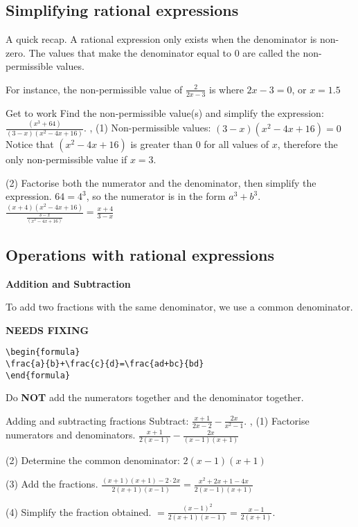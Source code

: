 \documentclass[../../main.tex]{subfiles}
\begin{document}
\subsection{Simplifying rational expressions}
A quick recap. A rational expression only exists when the denominator is non-zero. The values that make the denominator equal to 0 are called the non-permissible values.

For instance, the non-permissible value of $\frac{2}{2x-3}$ is where $2x-3=0$, or $x=1.5$

\begin{example}{Get to work}
Find the non-permissible value(s) and simplify the expression: $\frac{\left(x^{3}+64\right)}{(3-x)\left(x^{2}-4x+16\right)}$.
\sep
(1) Non-permissible values: $(3-x)\left(x^{2}-4x+16\right)=0$
Notice that $\left(x^{2}-4x+16\right)$ is greater than 0 for all values of $x$, therefore the only non-permissible value if $x=3$.

(2) Factorise both the numerator and the denominator, then simplify the expression. $64=4^{3}$, so the numerator is in the form $a^{3}+b^{3}$.
$\frac{(x+4)\left(x^{2}-4x+16\right)}{\frac{3-x}{\left(x^{2}-4x+16\right)}}=\frac{x+4}{3-x}$
\end{example}

\subsection{Operations with rational expressions}
\textbf{Addition and Subtraction}

To add two fractions with the same denominator, we use a common denominator.

{\hfill\Large\bfseries NEEDS FIXING\hfill}
\begin{lstlisting}
\begin{formula}
\frac{a}{b}+\frac{c}{d}=\frac{ad+bc}{bd}
\end{formula}
 \end{lstlisting} %
Do \textbf{NOT} add the numerators together and the denominator together. %

\begin{example}{Adding and subtracting fractions}
Subtract: $\frac{x+1}{2x-2}-\frac{2x}{x^{2}-1}$.
\sep
(1) Factorise numerators and denominators.
$\frac{x+1}{2(x-1)}-\frac{2x}{(x-1)(x+1)}$

(2) Determine the common denominator: $2(x-1)(x+1)$

(3) Add the fractions.
$\frac{(x+1)(x+1)-2 \cdot 2x}{2(x+1)(x-1)}=\frac{x^{2}+2x+1-4x}{2(x-1)(x+1)}$

(4) Simplify the fraction obtained.
$=\frac{(x-1)^{2}}{2(x+1)(x-1)}=\frac{x-1}{2(x+1)}$.
\end{example}
\end{document}
